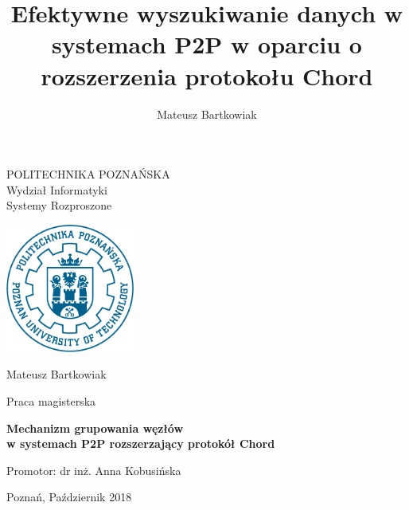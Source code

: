 \documentclass[12pt, twoside, openany]{report}
\author{Mateusz Bartkowiak}
\title{Efektywne wyszukiwanie danych w systemach P2P w oparciu o rozszerzenia protokołu Chord}
\begin{document}
\begin{titlepage}

\noindent


\centering
\Large POLITECHNIKA POZNAŃSKA\\
\Large Wydział Informatyki\\
\large Systemy Rozproszone

\vfill
\includegraphics[width=120pt,height=120pt]{PP}

\vfill
\center
\LARGE
Mateusz Bartkowiak

\center
\Large
Praca magisterska

\vfill
\center
\Huge
\textbf{Mechanizm grupowania węzłów \\w systemach P2P rozszerzający protokół Chord}


\vfill
\center
\Large
Promotor: dr inż. Anna Kobusińska

\vfill
\center
\large
Poznań, Październik 2018

\end{titlepage}

\tableofcontents


\end{document}
